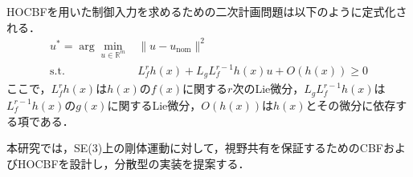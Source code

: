 HOCBFを用いた制御入力を求めるための二次計画問題は以下のように定式化される．
\begin{equation}
\begin{aligned}
u^* = \arg\min_{u \in \mathbb{R}^m} & \|u - u_{\text{nom}}\|^2 \\
\text{s.t.} & L_f^r h(x) + L_g L_f^{r-1} h(x)u + O(h(x)) \geq 0
\label{eq:hocbf_qp}
\end{aligned}
\end{equation}
ここで，$L_f^r h(x)$は$h(x)$の$f(x)$に関する$r$次のLie微分，$L_g L_f^{r-1} h(x)$は$L_f^{r-1} h(x)$の$g(x)$に関するLie微分，$O(h(x))$は$h(x)$とその微分に依存する項である．

本研究では，SE(3)上の剛体運動に対して，視野共有を保証するためのCBFおよびHOCBFを設計し，分散型の実装を提案する．
